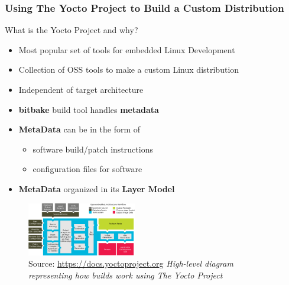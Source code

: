 \documentclass[8pt,compress]{beamer}
\newcommand\LightBold[1]{\textcolor{VSBlueLight}{\textbf{#1}}}
\newcommand\DarkBoldP[1]{\textcolor{VSPurpleDark}{\textbf{#1}}}
\begin{document}
\begin{frame}
  \frametitle{Using The Yocto Project to Build a Custom Distribution}
    \begin{block}{What is the Yocto Project and why?}
      {
        \begin{itemize}
          \item Most popular set of tools for embedded Linux Development
          \item Collection of OSS tools to make a custom Linux distribution
          \item Independent of target architecture
          \item \DarkBoldP{bitbake} build tool handles \LightBold{metadata}
          \item \LightBold{MetaData} can be in the form of 
            \begin{itemize}
              \item software build/patch instructions
              \item configuration files for software
            \end{itemize}
          \item \LightBold{MetaData} organized in its \LightBold{Layer Model}
        \end{itemize}
      }
    \end{block}
  \hfill
    \vspace{-12px}
    \center
    \begin{figure}
      \center
      \includegraphics[width=180px]{assets/diagrams/yocto-environment.png}
      \caption{Source: \href{https://docs.yoctoproject.org}{https://docs.yoctoproject.org}\hspace{\textwidth}
      \it High-level diagram representing how builds work using The Yocto Project}
    \end{figure}
\end{frame}
\end{document}
